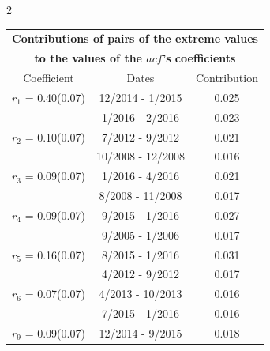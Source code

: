 
\thispagestyle{empty}
\begin{multicols}{2}{ 
\begin{tabular}{ccc}
\multicolumn{3}{c}{\textbf{Contributions of pairs of the extreme values} }  \vspace{-.10in}  \\ 
\multicolumn{3}{c}{ \textbf{to the values of the $acf$'s coefficients}} \\ 
\hline 
\hline                  Coefficient  &  Dates &  Contribution \\ 
\hline 
  $r_{ 1}$ = 0.40(0.07) &      12/2014 -  1/2015 &        0.025   \vspace{-.10in} \\  
&        1/2016 -  2/2016 &        0.023  \vspace{-.02in} \\ \hline 
  $r_{ 2}$ = 0.10(0.07) &       7/2012 -  9/2012 &        0.021   \vspace{-.10in} \\  
&       10/2008 - 12/2008 &        0.016  \vspace{-.02in} \\ \hline 
  $r_{ 3}$ = 0.09(0.07) &       1/2016 -  4/2016 &        0.021   \vspace{-.10in} \\  
&        8/2008 - 11/2008 &        0.017  \vspace{-.02in} \\ \hline 
  $r_{ 4}$ = 0.09(0.07) &       9/2015 -  1/2016 &        0.027   \vspace{-.10in} \\  
&        9/2005 -  1/2006 &        0.017  \vspace{-.02in} \\ \hline 
  $r_{ 5}$ = 0.16(0.07) &       8/2015 -  1/2016 &        0.031   \vspace{-.10in} \\  
&        4/2012 -  9/2012 &        0.017  \vspace{-.02in} \\ \hline 
  $r_{ 6}$ = 0.07(0.07) &       4/2013 - 10/2013 &        0.016   \vspace{-.10in} \\  
&        7/2015 -  1/2016 &        0.016  \vspace{-.02in} \\ \hline 
  $r_{ 9}$ = 0.09(0.07) &      12/2014 -  9/2015 &        0.018   \vspace{-.10in} \\  

\end{tabular}}
\end{multicols}
